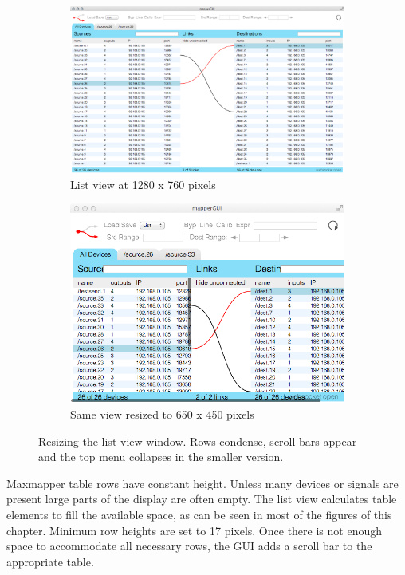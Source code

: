 \begin{figure}
	\centering
	\begin{subfigure}[]{\textwidth}
		\centering
		\includegraphics[width=\textwidth]{figures/before_resize_1280x760}
		\caption{List view at 1280 x 760 pixels}
		\label{fig:before_resize}
	\end{subfigure}
	\begin{subfigure}[]{0.5\textwidth}
		\centering
		\includegraphics[width=\textwidth]{figures/after_resize_650x450}
		\caption{Same view resized to 650 x 450 pixels}
		\label{fig:after_resize}
	\end{subfigure}
	\caption{Resizing the list view window. Rows condense, scroll bars appear and the top menu collapses in the smaller version.}\label{fig:resizing}
\end{figure}

Maxmapper table rows have constant height. Unless many devices or signals are present large parts of the display are often empty. The list view calculates table elements to fill the available space, as can be seen in most of the figures of this chapter. Minimum row heights are set to 17 pixels. Once there is not enough space to accommodate all necessary rows, the GUI adds a scroll bar to the appropriate table. 

